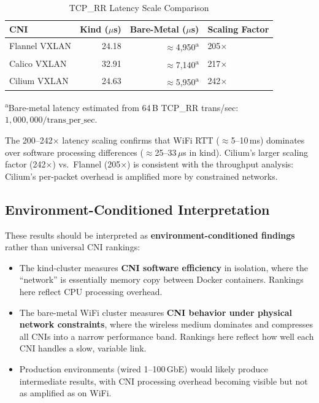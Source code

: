 \documentclass[11pt,a4paper]{article}
\begin{document}
\begin{table}[H]
\centering
\caption{TCP\_RR Latency Scale Comparison}
\begin{tabular}{lrrl}
  \toprule
  \textbf{CNI} & \textbf{Kind ($\mu$s)} & \textbf{Bare-Metal ($\mu$s)} & \textbf{Scaling Factor} \\
  \midrule
  Flannel VXLAN & 24.18 & $\approx$4{,}950\textsuperscript{a} & 205$\times$ \\
  Calico VXLAN  & 32.91 & $\approx$7{,}140\textsuperscript{a} & 217$\times$ \\
  Cilium VXLAN  & 24.63 & $\approx$5{,}950\textsuperscript{a} & 242$\times$ \\
  \bottomrule
\end{tabular}
\label{tab:cross-latency}
\end{table}

{\footnotesize \textsuperscript{a}Bare-metal latency estimated from 64\,B TCP\_RR trans/sec: $1{,}000{,}000 / \text{trans\_per\_sec}$.}

\noindent The 200--242$\times$ latency scaling confirms that WiFi RTT ($\approx$5--10\,ms) dominates over software processing differences ($\approx$25--33\,$\mu$s in kind). Cilium's larger scaling factor (242$\times$) vs.\ Flannel (205$\times$) is consistent with the throughput analysis: Cilium's per-packet overhead is amplified more by constrained networks.

\subsection{Environment-Conditioned Interpretation}

These results should be interpreted as \textbf{environment-conditioned findings} rather than universal CNI rankings:

\begin{itemize}
  \item The kind-cluster measures \textbf{CNI software efficiency} in isolation, where the ``network'' is essentially memory copy between Docker containers. Rankings here reflect CPU processing overhead.
  \item The bare-metal WiFi cluster measures \textbf{CNI behavior under physical network constraints}, where the wireless medium dominates and compresses all CNIs into a narrow performance band. Rankings here reflect how well each CNI handles a slow, variable link.
  \item Production environments (wired 1--100\,GbE) would likely produce intermediate results, with CNI processing overhead becoming visible but not as amplified as on WiFi.
\end{itemize}
\end{document}
